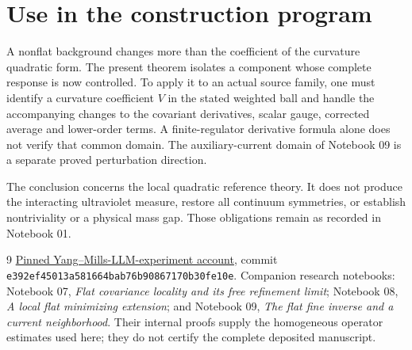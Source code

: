 \documentclass[11pt]{article}
\theoremstyle{remark}
\begin{document}
\section{Use in the construction program}

A nonflat background changes more than the coefficient of the
curvature quadratic form. The present theorem isolates a component
whose complete response is now controlled. To apply it to an actual
source family, one must identify a curvature coefficient $V$ in the
stated weighted ball and handle the accompanying changes to the
covariant derivatives, scalar gauge, corrected average and lower-order
terms. A finite-regulator derivative formula alone does not verify
that common domain. The auxiliary-current domain of Notebook 09 is a
separate proved perturbation direction.

The conclusion concerns the local quadratic reference theory. It
does not produce the interacting ultraviolet measure, restore all
continuum symmetries, or establish nontriviality or a physical mass gap.
Those obligations remain as recorded in Notebook 01.

\begin{thebibliography}{9}
\href{https://github.com/ethanwsussman/Yang--Mills-LLM-experiment/tree/e392ef45013a581664bab76b90867170b30fe10e}
{Pinned Yang--Mills-LLM-experiment account}, commit
\texttt{e392ef45013a581664bab76b90867170b30fe10e}.
Companion research notebooks: Notebook 07,
\emph{Flat covariance locality and its free refinement limit};
Notebook 08, \emph{A local flat minimizing extension}; and Notebook 09,
\emph{The flat fine inverse and a current neighborhood}.
Their internal proofs supply the homogeneous operator estimates
used here; they do not certify the complete deposited manuscript.
\end{thebibliography}
\end{document}
